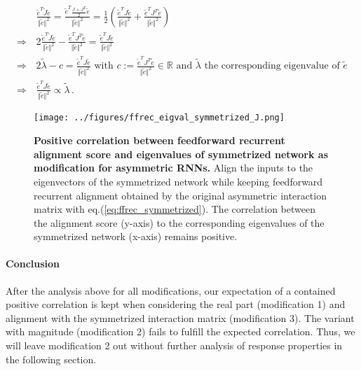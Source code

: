 \documentclass[11pt]{article}
\begin{document}
		\begin{equation}
			\begin{split}
				&\frac{\tilde{e}^T \tilde{J} \tilde{e}}{\Vert \tilde{e} \Vert^2} = \frac{\tilde{e}^T \frac{J + J^T}{2} \tilde{e}}{\Vert \tilde{e} \Vert^2} = \frac{1}{2} \left( \frac{\tilde{e}^T J \tilde{e}}{\Vert \tilde{e} \Vert^2} + \frac{\tilde{e}^T J^T \tilde{e}}{\Vert \tilde{e} \Vert^2} \right) \\
				\Rightarrow \,  & 2 \frac{\tilde{e}^T \tilde{J} \tilde{e}}{\Vert \tilde{e} \Vert^2} - \frac{\tilde{e}^T J^T \tilde{e}}{\Vert \tilde{e} \Vert^2} = \frac{\tilde{e}^T J \tilde{e}}{\Vert \tilde{e} \Vert^2} \\ 
				\Rightarrow \, & 2 \tilde{\lambda} - c = \frac{\tilde{e}^T J \tilde{e}}{\Vert \tilde{e} \Vert^2} \text{ with } c := \frac{\tilde{e}^T J^T \tilde{e}}{\Vert \tilde{e} \Vert^2} \in \mathbb{R} \text{ and $\tilde{\lambda}$ the corresponding eigenvalue of $\tilde{e}$} \\
				\Rightarrow \, & \frac{\tilde{e}^T J \tilde{e}}{\Vert \tilde{e} \Vert^2} \propto \tilde{\lambda} \, .
			\end{split}
		\end{equation}
	\begin{SCfigure}[0.95][h]
		\centering
		\caption[Positive correlation between feedforward recurrent alignment score and eigenvalues of symmetrized network as modification for asymmetric RNNs]{\textbf{Positive correlation between feedforward recurrent alignment score and eigenvalues of symmetrized network as modification for asymmetric RNNs.} Align the inputs to the eigenvectors of the symmetrized network while keeping feedforward recurrent alignment obtained by the original asymmetric interaction matrix with eq.(\ref{eq:ffrec_symmetrized}). The correlation between the alignment score (y-axis) to the corresponding eigenvalues of the symmetrized network (x-axis) remains positive.}
		\texttt{[image: ../figures/ffrec\_eigval\_symmetrized\_J.png]}
		\label{fig:ffrec_symmetrized}
	\end{SCfigure}
	
	\paragraph{Conclusion} After the analysis above for all modifications, our expectation of a contained positive correlation is kept when considering the real part (modification 1) and alignment with the symmetrized interaction matrix (modification 3). The variant with magnitude (modification 2) fails to fulfill the expected correlation. Thus, we will leave modification 2 out without further analysis of response properties in the following section. 
	
\end{document}
